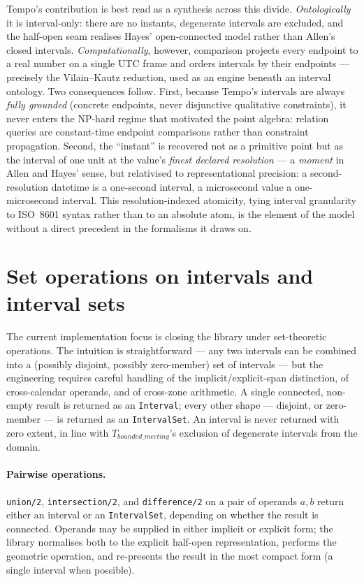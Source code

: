 Tempo's contribution is best read as a synthesis across this divide.
\emph{Ontologically} it is interval-only: there are no instants,
degenerate intervals are excluded, and the half-open seam realises
Hayes' open-connected model rather than Allen's closed intervals.
\emph{Computationally}, however, comparison projects every endpoint to
a real number on a single UTC frame and orders intervals by their
endpoints --- precisely the Vilain--Kautz reduction, used as an engine
beneath an interval ontology. Two consequences follow. First, because
Tempo's intervals are always \emph{fully grounded} (concrete
endpoints, never disjunctive qualitative constraints), it never enters
the NP-hard regime that motivated the point algebra: relation queries
are constant-time endpoint comparisons rather than constraint
propagation. Second, the ``instant'' is recovered not as a primitive
point but as the interval of one unit at the value's \emph{finest
declared resolution} --- a \emph{moment} in Allen and Hayes' sense,
but relativised to representational precision: a second-resolution
datetime is a one-second interval, a microsecond value a
one-microsecond interval. This resolution-indexed atomicity, tying
interval granularity to ISO~8601 syntax rather than to an absolute
atom, is the element of the model without a direct precedent in the
formalisms it draws on.

\section{Set operations on intervals and interval sets}

The current implementation focus is closing the library under
set-theoretic operations. The intuition is straightforward --- any
two intervals can be combined into a (possibly disjoint, possibly
zero-member) set of intervals --- but the engineering requires careful
handling of the implicit/explicit-span distinction, of cross-calendar
operands, and of cross-zone arithmetic. A single connected, non-empty
result is returned as an \texttt{Interval}; every other shape ---
disjoint, or zero-member --- is returned as an \texttt{IntervalSet}.
An interval is never returned with zero extent, in line with
$T_{bounded\_meeting}$'s exclusion of degenerate intervals from the
domain.

\paragraph*{Pairwise operations.} \texttt{union/2}, \texttt{intersection/2},
and \texttt{difference/2} on a pair of operands $a, b$ return either an
interval or an \texttt{IntervalSet}, depending on whether the result
is connected. Operands may be supplied in either implicit or explicit
form; the library normalises both to the explicit half-open
representation, performs the geometric operation, and re-presents the
result in the most compact form (a single interval when possible).

